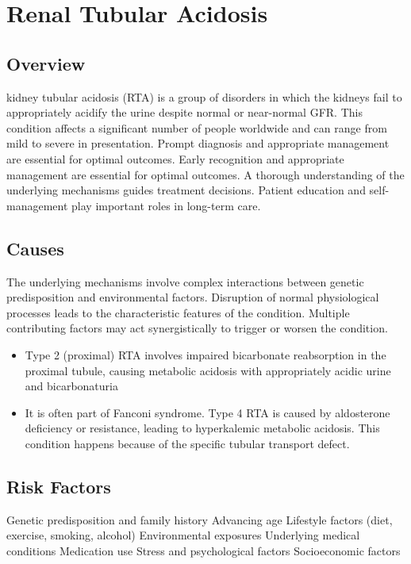 \chapter{Renal Tubular Acidosis}
\label{sec:Renal Tubular Acidosis}

\section{Overview}
kidney tubular acidosis (RTA) is a group of disorders in which the kidneys fail to appropriately acidify the urine despite normal or near-normal GFR. This condition affects a significant number of people worldwide and can range from mild to severe in presentation. Prompt diagnosis and appropriate management are essential for optimal outcomes. Early recognition and appropriate management are essential for optimal outcomes. A thorough understanding of the underlying mechanisms guides treatment decisions. Patient education and self-management play important roles in long-term care.
\section{Causes}
The underlying mechanisms involve complex interactions between genetic predisposition and environmental factors. Disruption of normal physiological processes leads to the characteristic features of the condition. Multiple contributing factors may act synergistically to trigger or worsen the condition.

\begin{itemize}[noitemsep]
  \item Type 2 (proximal) RTA involves impaired bicarbonate reabsorption in the proximal tubule, causing metabolic acidosis with appropriately acidic urine and bicarbonaturia
  \item It is often part of Fanconi syndrome. Type 4 RTA is caused by aldosterone deficiency or resistance, leading to hyperkalemic metabolic acidosis. This condition happens because of the specific tubular transport defect.
\end{itemize}
\section{Risk Factors}
Genetic predisposition and family history Advancing age Lifestyle factors (diet, exercise, smoking, alcohol) Environmental exposures Underlying medical conditions Medication use Stress and psychological factors Socioeconomic factors


